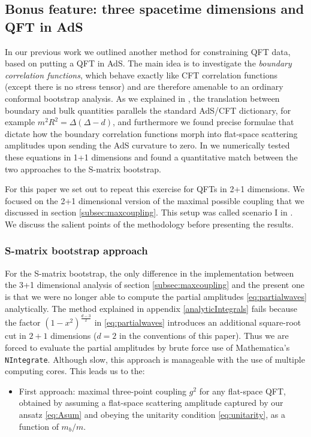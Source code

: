 \documentclass[12pt]{article}
\newcommand{\<}{{\langle}}
\renewcommand{\>}{{\rangle}}
\begin{document}
\subsection{Bonus feature: three spacetime dimensions and QFT in AdS}
\label{sec:bonus}
In our previous work \cite{paperI} we outlined another method for constraining QFT data, based on putting a QFT in AdS. The main idea is to investigate the \emph{boundary correlation functions}, which behave exactly like CFT correlation functions (except there is no stress tensor) and are therefore amenable to an ordinary conformal bootstrap analysis. As we explained in \cite{paperI}, the translation between boundary and bulk quantities parallels the standard AdS/CFT dictionary, for example $m^2 R^2 = \Delta (\Delta - d)$, and furthermore we found precise formulae that dictate how the boundary correlation functions morph into flat-space scattering amplitudes upon sending the AdS curvature to zero. In \cite{paperI} we numerically tested these equations in 1+1 dimensions and found a quantitative match between the two approaches to the S-matrix bootstrap.

For this paper we set out to repeat this exercise for QFTs in 2+1 dimensions. We focused on the 2+1 dimensional version of the maximal possible coupling that we discussed in section \ref{subsec:maxcoupling}. This setup was called scenario I in \cite{paperI}. We discuss the salient points of the methodology before presenting the results.

\subsubsection{S-matrix bootstrap approach}
For the S-matrix bootstrap, the only difference in the implementation between the 3+1 dimensional analysis of section \ref{subsec:maxcoupling} and the present one is that we were no longer able to compute the partial amplitudes \eqref{eq:partialwaves} analytically.  The method explained in appendix \ref{analyticIntegrals} fails because the factor $(1-x^2)^{\frac{d-3}{2}}$ in \eqref{eq:partialwaves} introduces an additional square-root cut in $2+1$ dimensions ($d=2$ in the conventions of this paper).  Thus we are forced to evaluate the partial amplitudes by brute force use of Mathematica's \verb"NIntegrate".  Although slow, this approach is manageable with the use of multiple computing cores. This leads us to the:
\begin{itemize}
  \item[\color{red}\textbullet] {\color{red}First approach:} maximal three-point coupling $g^2$ for any flat-space QFT, obtained by assuming a flat-space scattering amplitude captured by our ansatz \eqref{eq:Asum} and obeying the unitarity condition \eqref{eq:unitarity}, as a function of $m_b/m$.
\end{itemize}
\end{document}
